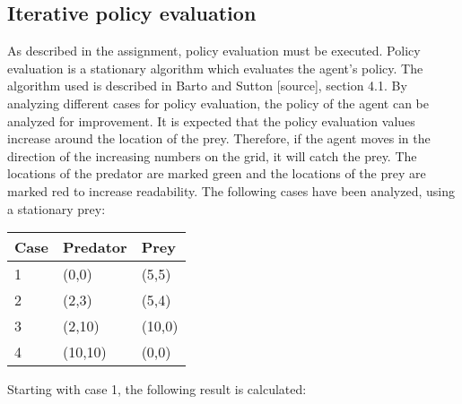 \documentclass{article}
\begin{document}
\subsection*{Iterative policy evaluation}
As described in the assignment, policy evaluation must be executed. Policy evaluation is a stationary algorithm which evaluates the agent's policy. The algorithm used is described in Barto and Sutton [source], section 4.1. By analyzing different cases for policy evaluation, the policy of the agent can be analyzed for improvement. It is expected that the policy evaluation values increase around the location of the prey. Therefore, if the agent moves in the direction of the increasing numbers on the grid, it will catch the prey. The locations of the predator are marked green and the locations of the prey are marked red to increase readability. The following cases have been analyzed, using a stationary prey:
\begin{center}
	\begin{tabular}{ | l | l | l |}
	\hline
	Case & Predator & Prey\\
	\hline
	1 & (0,0) & (5,5)\\ 
	\hline
	2 & (2,3) & (5,4)\\ 
	\hline
	3 & (2,10) & (10,0)\\ 
	\hline
	4 & (10,10) & (0,0)\\ 
	\hline
	\end{tabular}
\end{center}

Starting with case 1, the following result is calculated:
\end{document}
